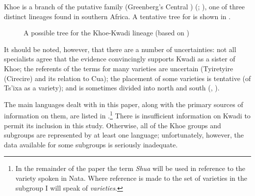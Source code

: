 \documentclass[output=paper]{LSP/langsci}
\begin{document}
Khoe is a branch of the putative  family (Greenberg’s Central ) (\citealt{Gldemann2004Reconstruction,Guldemannetal2010External,Vossen1997Khoe}; \citealt[10--11]{Vossen2013Khoisan}), one of three distinct  lineages found in southern Africa. A tentative tree for  is shown in .

\begin{figure}
\caption{A possible tree for the Khoe-Kwadi lineage (based on \citealt[27]{Gueldemann2014Khoisan})}\label{09-mc-fig:1}
 \end{figure}
 

It should be noted, however, that there are a number of uncertainties: not all specialists agree that the evidence convincingly supports Kwadi as a sister of Khoe; the referents of the terms for many varieties are uncertain (\eg Tyiretyire (Cirecire) and its relation to Cua); the placement of some varieties is tentative (\eg of Ts’ixa as a  variety); and  is sometimes divided into north and south (\eg \citealt[102]{Guldemannetal2000Khoisan}, \cf \citealt[28]{Gueldemann2014Khoisan}).

The main languages dealt with in this paper, along with the primary sources of information on them, are listed in .\footnote{In the remainder of the paper the term \textit{Shua} will be used in reference to the variety spoken in Nata. Where reference is made to the set of varieties in the subgroup I will speak of \textit{ varieties}.} There is insufficient information on Kwadi to permit its inclusion in this study. Otherwise, all of the Khoe groups and subgroups are represented by at least one language; unfortunately, however, the data available for some subgroups is seriously inadequate.
\end{document}
